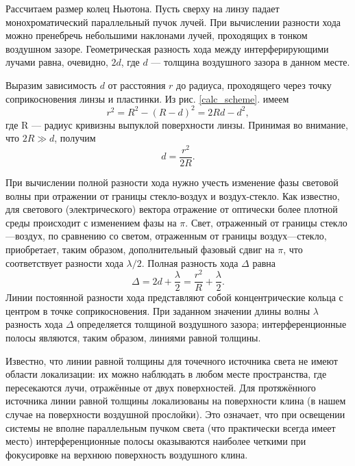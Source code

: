 \documentclass[a4paper, 12pt]{article}
\begin{document}
	Рассчитаем размер колец Ньютона. Пусть сверху на линзу падает монохроматический параллельный пучок лучей. При вычислении разности хода можно пренебречь небольшими наклонами лучей, проходящих в тонком воздушном зазоре. Геометрическая разность хода между интерферирующими лучами равна, очевидно, $2d$, где $d$ — толщина воздушного зазора в данном месте.\par
	Выразим зависимость $d$ от расстояния $r$ до радиуса, проходящего через точку соприкосновения линзы и пластинки. Из рис. \ref{calc_scheme}. имеем
	\begin{equation*}
		r^2=R^2-\left(R-d\right)^2=2Rd-d^2,
	\end{equation*}
	где R — радиус кривизны выпуклой поверхности линзы. Принимая во внимание, что $2R\gg d$, получим
	\begin{equation}
		d=\frac{r^2}{2R}.
	\end{equation}
	\par
	При вычислении полной разности хода нужно учесть изменение фазы световой волны при отражении от границы стекло-воздух и воздух-стекло. Как известно, для светового (электрического) вектора отражение от оптически более плотной среды происходит с изменением фазы на $\pi$. Свет, отраженный от границы стекло—воздух, по сравнению со светом, отраженным от границы воздух—стекло, приобретает, таким образом, дополнительный фазовый сдвиг на $\pi$, что соответствует разности хода $\lambda/2$. Полная разность хода $\Delta$ равна
	\begin{equation}
		\Delta=2d+\frac{\lambda}{2}=\frac{r^2}{R}+\frac{\lambda}{2}.
		\label{way_delta_eq}
	\end{equation}
	Линии постоянной разности хода представляют собой концентрические кольца с центром в точке соприкосновения. При заданном значении длины волны $\lambda$ разность хода $\Delta$ определяется толщиной воздушного зазора; интерференционные полосы являются, таким образом, линиями равной толщины.\par
	Известно, что линии равной толщины для точечного источника света не имеют области локализации: их можно наблюдать в любом месте пространства, где пересекаются лучи, отражённые от двух поверхностей. Для протяжённого источника линии равной толщины локализованы на поверхности клина (в нашем случае на поверхности воздушной прослойки). Это означает, что при освещении системы не вполне параллельным пучком света (что практически всегда имеет место) интерференционные полосы оказываются наиболее четкими при фокусировке на верхнюю поверхность воздушного клина.\par
\end{document}
